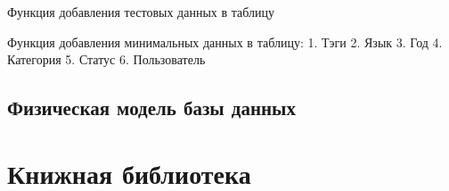 \documentclass[letterpaper,10pt,russian]{sphinxmanual}
\begin{document}
\begin{fulllineitems}
\begin{fulllineitems}
\end{fulllineitems}


\begin{fulllineitems}
\label{\detokenize{database.sqlite3_interface:database.sqlite3_interface.create_db.CreateDataBase.insert_data_to_db}}
\pysigstartsignatures
{}
\pysigstopsignatures
\sphinxAtStartPar
Функция добавления тестовых данных в таблицу

\end{fulllineitems}


\begin{fulllineitems}
\label{\detokenize{database.sqlite3_interface:database.sqlite3_interface.create_db.CreateDataBase.insert_minimum_data_to_db}}
\pysigstartsignatures
{}
\pysigstopsignatures
\sphinxAtStartPar
Функция добавления минимальных данных в таблицу:
1. Тэги
2. Язык
3. Год
4. Категория
5. Статус
6. Пользователь

\end{fulllineitems}


\end{fulllineitems}



\section{Физическая модель базы данных}
\label{\detokenize{database.sqlite3_interface:id2}}
\noindent{}

\sphinxstepscope


\chapter{Книжная библиотека}
\label{\detokenize{modules:id1}}\label{\detokenize{modules::doc}}
\sphinxstepscope
\end{document}
